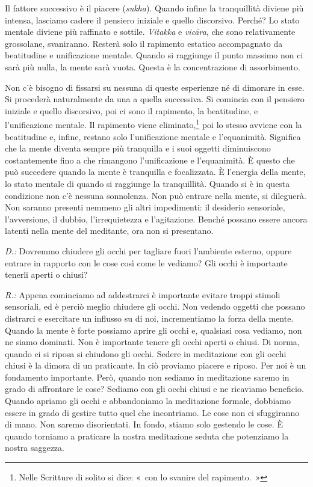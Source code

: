 Il fattore successivo è il piacere (\emph{sukha}). Quando infine la
tranquillità diviene più intensa, lasciamo cadere il pensiero iniziale e
quello discorsivo. Perché? Lo stato mentale diviene più raffinato e
sottile. \emph{Vitakka} e \emph{vicāra}, che sono relativamente
grossolane, svaniranno. Resterà solo il rapimento estatico accompagnato
da beatitudine e unificazione mentale. Quando si raggiunge il punto
massimo non ci sarà più nulla, la mente sarà vuota. Questa è la
concentrazione di assorbimento.

Non c'è bisogno di fissarsi su nessuna di queste esperienze né di
dimorare in esse. Si procederà naturalmente da una a quella successiva.
Si comincia con il pensiero iniziale e quello discorsivo, poi ci sono il
rapimento, la beatitudine, e l'unificazione mentale. Il rapimento viene
eliminato,\footnote{Nelle Scritture di solito si dice: «~con lo svanire
  del rapimento.~»} poi lo stesso avviene con la beatitudine e, infine,
restano solo l'unificazione mentale e l'equanimità. Significa che la
mente diventa sempre più tranquilla e i suoi oggetti diminuiscono
costantemente fino a che rimangono l'unificazione e l'equanimità. È
questo che può succedere quando la mente è tranquilla e focalizzata. È
l'energia della mente, lo stato mentale di quando si raggiunge la
tranquillità. Quando si è in questa condizione non c'è nessuna
sonnolenza. Non può entrare nella mente, si dileguerà. Non saranno
presenti nemmeno gli altri impedimenti: il desiderio sensoriale,
l'avversione, il dubbio, l'irrequietezza e l'agitazione. Benché possano
essere ancora latenti nella mente del meditante, ora non si presentano.

\emph{D.:} Dovremmo chiudere gli occhi per tagliare fuori l'ambiente esterno,
oppure entrare in rapporto con le cose così come le vediamo? Gli occhi è
importante tenerli aperti o chiusi?

\emph{R.:} Appena cominciamo ad addestrarci è importante evitare troppi stimoli
sensoriali, ed è perciò meglio chiudere gli occhi. Non vedendo oggetti
che possano distrarci e esercitare un influsso su di noi, incrementiamo
la forza della mente. Quando la mente è forte possiamo aprire gli occhi
e, qualsiasi cosa vediamo, non ne siamo dominati. Non è importante
tenere gli occhi aperti o chiusi. Di norma, quando ci si riposa si
chiudono gli occhi. Sedere in meditazione con gli occhi chiusi è la
dimora di un praticante. In ciò proviamo piacere e riposo. Per noi è un
fondamento importante. Però, quando non sediamo in meditazione saremo in
grado di affrontare le cose? Sediamo con gli occhi chiusi e ne ricaviamo
beneficio. Quando apriamo gli occhi e abbandoniamo la meditazione
formale, dobbiamo essere in grado di gestire tutto quel che incontriamo.
Le cose non ci sfuggiranno di mano. Non saremo disorientati. In fondo,
stiamo solo gestendo le cose. È quando torniamo a praticare la nostra
meditazione seduta che potenziamo la nostra saggezza.

